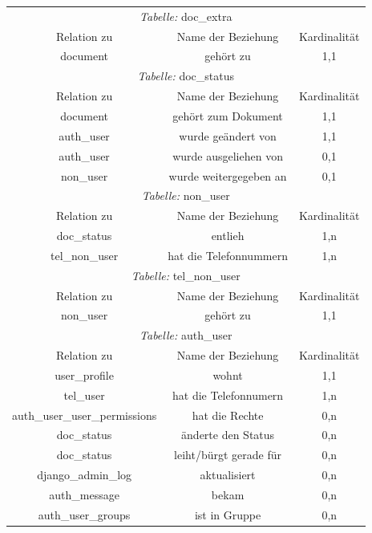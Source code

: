 \begin{longtable}{@{}ccc@{}}
  \toprule
  \multicolumn{3}{c}{\emph{Tabelle:} doc\_extra} \\
  Relation zu & Name der Beziehung & Kardinalität \\
  \cmidrule(lr){1-1}\cmidrule(lr){2-2}\cmidrule(lr){3-3}
  document & gehört zu & 1,1 \\

  \toprule
  \multicolumn{3}{c}{\emph{Tabelle:} doc\_status} \\
  Relation zu & Name der Beziehung & Kardinalität \\
  \cmidrule(lr){1-1}\cmidrule(lr){2-2}\cmidrule(lr){3-3}
  document & gehört zum Dokument & 1,1\\
  auth\_user & wurde geändert von & 1,1\\
  auth\_user & wurde ausgeliehen von & 0,1\\
  non\_user & wurde weitergegeben an & 0,1\\

  \toprule
  \multicolumn{3}{c}{\emph{Tabelle:} non\_user} \\
  Relation zu & Name der Beziehung & Kardinalität \\
  \cmidrule(lr){1-1}\cmidrule(lr){2-2}\cmidrule(lr){3-3}
  doc\_status & entlieh & 1,n\\
  tel\_non\_user & hat die Telefonnummern & 1,n\\

  \toprule
  \multicolumn{3}{c}{\emph{Tabelle:} tel\_non\_user} \\
  Relation zu & Name der Beziehung & Kardinalität \\
  \cmidrule(lr){1-1}\cmidrule(lr){2-2}\cmidrule(lr){3-3}
  non\_user & gehört zu & 1,1 \\

  \toprule
  \multicolumn{3}{c}{\emph{Tabelle:} auth\_user} \\
  Relation zu & Name der Beziehung & Kardinalität \\
  \cmidrule(lr){1-1}\cmidrule(lr){2-2}\cmidrule(lr){3-3}
  user\_profile & wohnt & 1,1\\
  tel\_user & hat die Telefonnumern & 1,n\\
  auth\_user\_user\_permissions & hat die Rechte & 0,n\\
  doc\_status & änderte den Status & 0,n\\  
  doc\_status & leiht/bürgt gerade für & 0,n\\
  django\_admin\_log & aktualisiert & 0,n\\
  auth\_message & bekam & 0,n\\
  auth\_user\_groups & ist in Gruppe & 0,n\\


\end{longtable}
